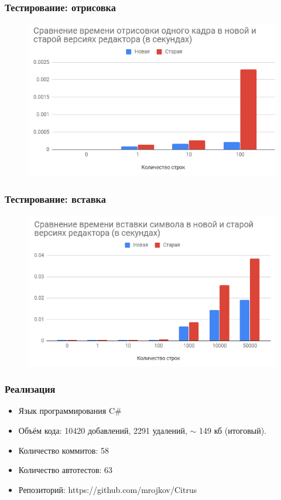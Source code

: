 \documentclass[10pt, unicode]{beamer}
\begin{document}
    \begin{frame}
        \frametitle{Тестирование: отрисовка}
        \begin{figure}
            \centering
            \includegraphics[width=\textwidth]{images/RenderComparisonSmall.png}
        \end{figure}
    \end{frame}
    \begin{frame}
        \frametitle{Тестирование: вставка}
        \begin{figure}
            \centering
            \includegraphics[width=\textwidth]{images/InsertionComparison.png}
        \end{figure}
    \end{frame}
    \begin{frame}
        \frametitle{Реализация}
        \begin{itemize}
            \item Язык программирования C\#
            \item Объём кода: 10420 добавлений, 2291 удалений, $\sim$ 149 кб (итоговый).
            \item Количество коммитов: 58
            \item Количество автотестов: 63
            \item Репозиторий: https://github.com/mrojkov/Citrus
        \end{itemize}
    \end{frame}
\end{document}

